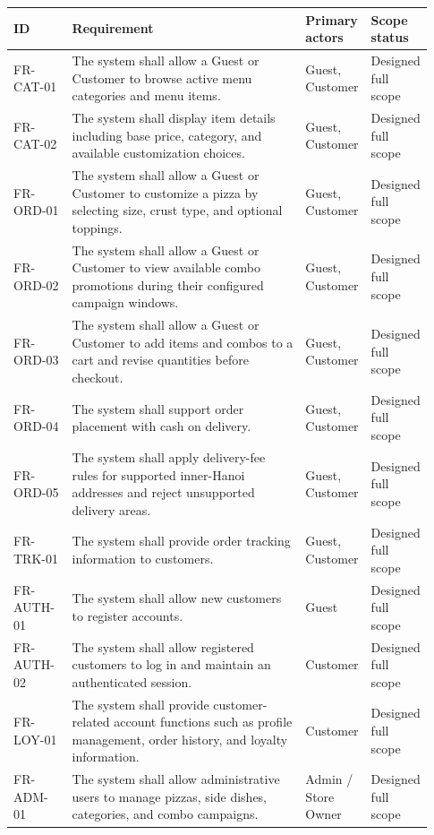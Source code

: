 \begingroup
\footnotesize
\setlength{\LTpre}{0.4em}
\setlength{\LTpost}{0.8em}
\label{tab:functional-requirements}
\begin{tabular}{L{0.14\linewidth} L{0.56\linewidth} L{0.14\linewidth} L{0.09\linewidth}}
\toprule
\textbf{ID} & \textbf{Requirement} & \textbf{Primary actors} & \textbf{Scope status} \\
\midrule
FR-CAT-01 & The system shall allow a Guest or Customer to browse active menu categories and menu items. & Guest, Customer & Designed full scope \\
FR-CAT-02 & The system shall display item details including base price, category, and available customization choices. & Guest, Customer & Designed full scope \\
FR-ORD-01 & The system shall allow a Guest or Customer to customize a pizza by selecting size, crust type, and optional toppings. & Guest, Customer & Designed full scope \\
FR-ORD-02 & The system shall allow a Guest or Customer to view available combo promotions during their configured campaign windows. & Guest, Customer & Designed full scope \\
FR-ORD-03 & The system shall allow a Guest or Customer to add items and combos to a cart and revise quantities before checkout. & Guest, Customer & Designed full scope \\
FR-ORD-04 & The system shall support order placement with cash on delivery. & Guest, Customer & Designed full scope \\
FR-ORD-05 & The system shall apply delivery-fee rules for supported inner-Hanoi addresses and reject unsupported delivery areas. & Guest, Customer & Designed full scope \\
FR-TRK-01 & The system shall provide order tracking information to customers. & Guest, Customer & Designed full scope \\
FR-AUTH-01 & The system shall allow new customers to register accounts. & Guest & Designed full scope \\
FR-AUTH-02 & The system shall allow registered customers to log in and maintain an authenticated session. & Customer & Designed full scope \\
FR-LOY-01 & The system shall provide customer-related account functions such as profile management, order history, and loyalty information. & Customer & Designed full scope \\
FR-ADM-01 & The system shall allow administrative users to manage pizzas, side dishes, categories, and combo campaigns. & Admin / Store Owner & Designed full scope \\

\end{tabular}
